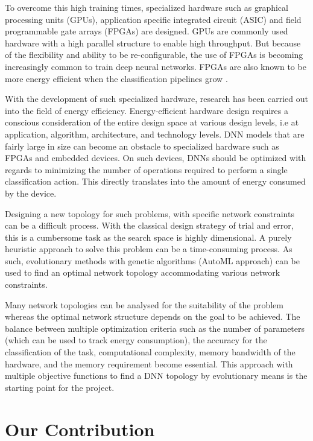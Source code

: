 To overcome this high training times, specialized hardware such as graphical processing units (GPUs), application specific integrated circuit (ASIC) and field programmable gate arrays (FPGAs) are designed. 
GPUs are commonly used hardware with a high parallel structure to enable high throughput. But because of the flexibility and ability to be re-configurable, the use of FPGAs is becoming increasingly common to train deep neural networks. FPGAs are also known to be more energy efficient when the classification pipelines grow \cite{qasaimeh2019comparing}.

With the development of such specialized hardware, research has been carried out into the field of energy efficiency. Energy-efficient hardware design requires a conscious consideration of the entire design space at various design levels, i.e at application, algorithm, architecture, and technology levels.
DNN models that are fairly large in size can become an obstacle to specialized hardware such as FPGAs and embedded devices. On such devices, DNNs should be optimized with regards to minimizing the number of operations required to perform a single classification action. This directly translates into the amount of energy consumed by the device.

Designing a new topology for such problems, with specific network constraints can be a difficult process. With the classical design strategy of trial and error, this is a cumbersome task as the search space is highly dimensional. A purely heuristic approach to solve this problem can be a time-consuming process. As such, evolutionary methods with genetic algorithms (AutoML approach) can be used to find an optimal network topology accommodating various network constraints.

Many network topologies can be analysed for the suitability of the problem whereas the optimal network structure depends on the goal to be achieved. The balance between multiple optimization criteria such as the number of parameters (which can be used to track energy consumption), the accuracy for the classification of the task, computational complexity, memory bandwidth of the hardware, and the memory requirement become essential. This approach with multiple objective functions to find a DNN topology by evolutionary means is the starting point for the project. 

\section{Our Contribution}


